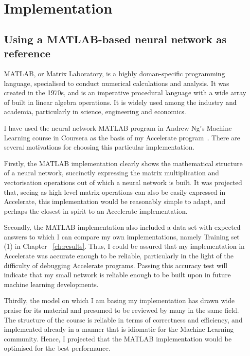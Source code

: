 \newcommand{\liam}[1]{$\langle$ \textit{\textbf{Liam} #1} $\rangle\ $}
\chapter{Implementation}\label{ch:impl}

\section{Using a MATLAB-based neural network as reference} \label{se:impl.matlab.nn}

MATLAB, or Matrix Laboratory, is a highly doman-specific programming language, specialised to conduct numerical calculations and analysis. It was created in the 1970s, and is an imperative procedural language with a wide array of built in linear algebra operations. It is widely used among the industry and academia, particularly in science, engineering and economics.

I have used the neural network MATLAB program in Andrew Ng's Machine Learning course in Coursera as the basis of my Accelerate program~\cite{Ng12}. There are several motivations for choosing this particular implementation. 

Firstly, the MATLAB implementation clearly shows the mathematical structure of a neural network, succinctly expressing the matrix multiplication and vectorisation operations out of which a neural network is built. It was projected that, seeing as high level matrix operations can also be easily expressed in Accelerate, this implementation would be reasonably simple to adapt, and perhaps the closest-in-spirit to an Accelerate implementation.

Secondly, the MATLAB implementation also included a data set with expected answers to which I can compare my own implementations, namely Training set (1) in Chapter ~\ref{ch:results}. Thus, I could be assured that my implementation in Accelerate was accurate enough to be reliable, particularly in the light of the difficulty of debugging Accelerate programs. Passing this accuracy test will indicate that my small network is reliable enough to be built upon in future machine learning developments.

Thirdly, the model on which I am basing my implementation has drawn wide praise for its material and presumed to be reviewed by many in the same field. The structure of the course is reliable in terms of correctness and efficiency, and implemented already in a manner that is idiomatic for the Machine Learning community. Hence, I projected that the MATLAB implementation would be optimised for the best performance.

